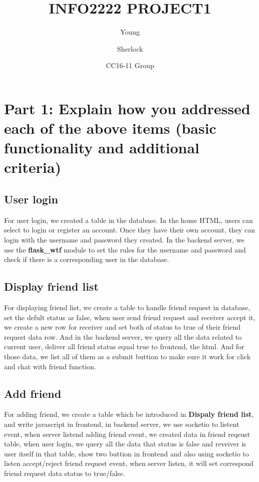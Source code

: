 \documentclass{article}
\title{INFO2222 PROJECT1}
\author{Young \and Sherlock \and CC16-11 Group}
\date{}
\begin{document}
\maketitle

\section{Part 1: Explain how you addressed each of the above items (basic functionality and additional criteria)}
\subsection{User login} 
For user login, we created a table in the database. In the home HTML, users can select to login or register an account. Once they have their own account, they can login with the username and password they created. In the backend server, we use the \textbf{flask\_wtf} module to set the rules for the username and password and check if there is a corresponding user in the database.

\subsection{Display friend list}
For displaying friend list, we create a table to handle friend request in database, set the defult status as false, when user send friend request and receiver accept it, we create a new row for receiver and set both of status to true of their friend request data row. And in the backend server, we query all the data related to current user, deliver all friend status equal true to frontend, the html. And for those data, we list all of them as a submit buttion to make sure it work for click and chat with friend function.

\subsection{Add friend}
 For adding friend, we create a table which be introduced in \textbf{Dispaly friend list}, and write javascript in frontend, in backend server, we use socketio to listent event, when server listend adding friend event, we created data in friend reqeust table, when user login, we query all the data that status is false and reveiver is user itself in that table, show two buttion in frontend and also using socketio to listen accept/reject friend request event, when server listen, it will set correspond friend request data status to true/false.
 
\end{document}
